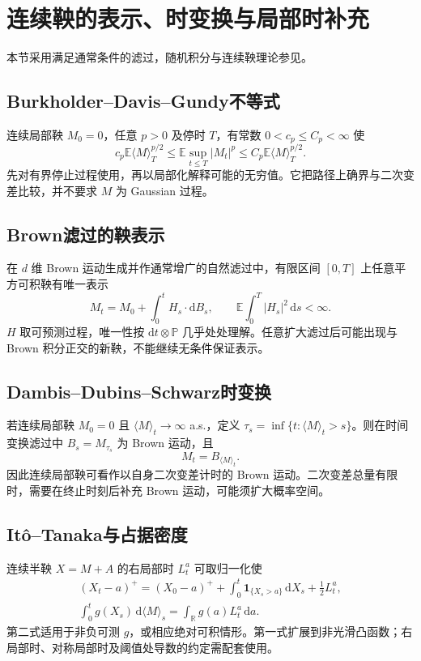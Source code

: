 \documentclass[../main.tex]{subfiles}
\begin{document}
\section{连续鞅的表示、时变换与局部时补充}
本节采用满足通常条件的滤过，随机积分与连续鞅理论参见\cite{legall}。
\subsection{Burkholder--Davis--Gundy不等式}
连续局部鞅 $M_0=0$，任意 $p>0$ 及停时 $T$，有常数 $0<c_p\le C_p<\infty$ 使
\[
c_p\mathbb E\langle M\rangle_T^{p/2}
\le\mathbb E\sup_{t\le T}|M_t|^p
\le C_p\mathbb E\langle M\rangle_T^{p/2}.
\]
先对有界停止过程使用，再以局部化解释可能的无穷值。它把路径上确界与二次变差比较，并不要求 $M$ 为 Gaussian 过程。
\subsection{Brown滤过的鞅表示}
在 $d$ 维 Brown 运动生成并作通常增广的自然滤过中，有限区间 $[0,T]$ 上任意平方可积鞅有唯一表示
\[
M_t=M_0+\int_0^tH_s\cdot\mathrm dB_s,\qquad
\mathbb E\int_0^T|H_s|^2\,\mathrm ds<\infty.
\]
$H$ 取可预测过程，唯一性按 $\mathrm dt\otimes\mathbb P$ 几乎处处理解。任意扩大滤过后可能出现与 Brown 积分正交的新鞅，不能继续无条件保证表示。
\subsection{Dambis--Dubins--Schwarz时变换}
若连续局部鞅 $M_0=0$ 且 $\langle M\rangle_t\to\infty$ a.s.，定义 $\tau_s=\inf\{t:\langle M\rangle_t>s\}$。则在时间变换滤过中 $B_s=M_{\tau_s}$ 为 Brown 运动，且
\[
M_t=B_{\langle M\rangle_t}.
\]
因此连续局部鞅可看作以自身二次变差计时的 Brown 运动。二次变差总量有限时，需要在终止时刻后补充 Brown 运动，可能须扩大概率空间。
\subsection{Itô--Tanaka与占据密度}
连续半鞅 $X=M+A$ 的右局部时 $L_t^a$ 可取归一化使
\begin{gather*}
(X_t-a)^+=(X_0-a)^++\int_0^t\mathbf1_{\{X_s>a\}}\,\mathrm dX_s+\tfrac12L_t^a,\\
\int_0^tg(X_s)\,\mathrm d\langle M\rangle_s
=\int_{\mathbb R}g(a)L_t^a\,\mathrm da.
\end{gather*}
第二式适用于非负可测 $g$，或相应绝对可积情形。第一式扩展到非光滑凸函数；右局部时、对称局部时及阈值处导数的约定需配套使用。
\clearpage
\end{document}
